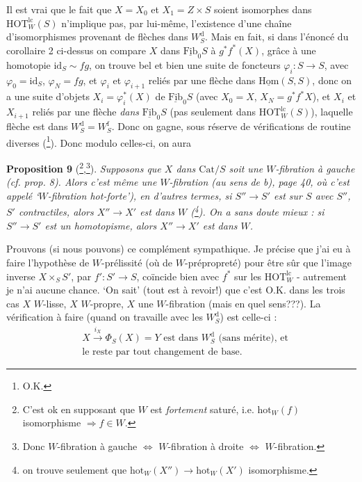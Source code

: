 \documentclass[11pt]{article}
\newcommand{\msp}[1]{\marginpar{\footnotesize [#1]}}
\newcommand{\hot}{\mathrm{hot}}
\newcommand{\id}{\mathrm{id}}
\newcommand{\HOTlc}{\mathrm{HOT}^{\mathrm{lc}}_W}
\newcommand{\Wd}{W^{\mathrm{d}}_S}
\newcommand{\Wf}{W^{\mathrm{f}}_S}
\begin{document}
Il est vrai que le fait que $X = X_0$ et $X_1 = Z \times S$ soient isomorphes dans $\HOTlc(S)$ n'implique pas, par lui-même, l'existence d'une \msp{page 48} chaîne d'isomorphismes provenant de flèches dans $\Wd$. Mais en fait, si dans l'énoncé du corollaire 2 ci-dessus on compare $X$ dans $\underline{\mathrm{Fib}}_0S$ à $g^*f^*(X)$, grâce à une homotopie $\id_S \sim fg$, on trouve bel et bien une suite de foncteurs $\varphi_i : S \longrightarrow S$, avec $\varphi_0 = \id_S$, $\varphi_N = fg$, et $\varphi_i$ et $\varphi_{i+1}$ reliés par une flèche dans $\underline{\mathrm{Hom}}(S,S)$, donc on a une suite d'objets $X_i = \varphi_i^*(X)$ de $\underline{\mathrm{Fib}}_0S$ (avec $X_0 = X$, $X_N = g^*f^*X$), et $X_i$ et $X_{i+1}$ reliés par une flèche \textit{dans} $\underline{\mathrm{Fib}}_0S$ (pas seulement dans $\HOTlc(S)$), laquelle flèche est dans $\Wd = \Wf$. Donc on gagne, sous réserve de vérifications de routine diverses (\footnote[55]{O.K.}). Donc modulo celles-ci, on aura

\textbf{Proposition 9} (\footnote[56]{C'est ok en supposant que $W$ est \textit{fortement} saturé, i.e. $\hot_W(f)$ isomorphisme $\Longrightarrow f \in W$.},\footnote[57]{Donc $W$-fibration à gauche $\Longleftrightarrow$ $W$-fibration à droite $\Longleftrightarrow$ $W$-fibration.}). \textit{Supposons que $X$ dans $\mathrm{Cat}/S$ soit une $W$-fibration à gauche (cf. prop. 8). Alors c'est même une $W$-fibration (au sens de b), page 40, où c'est appelé `$W$-fibration \textup{hot}-forte'), en d'autres termes, si $S'' \longrightarrow S'$ est sur $S$ avec $S''$, $S'$ contractiles, alors $X'' \longrightarrow X'$ est dans $W$ (\footnote[58]{on trouve seulement que $\hot_W(X'') \longrightarrow \hot_W(X')$ isomorphisme.}). On a sans doute mieux : si $S'' \longrightarrow S'$ est un homotopisme, alors $X'' \longrightarrow X'$ est dans $W$.}

\msp{page 49}
Prouvons (si nous pouvons) ce complément sympathique. Je précise que j'ai eu à faire l'hypothèse de $W$-prélissité (où de $W$-prépropreté) pour être sûr que l'image inverse $X \times_S S'$, par $f' : S' \longrightarrow S$, coïncide bien avec $f^*$ sur les $\HOTlc$ - autrement je n'ai aucune chance. %
`On sait' (tout est à revoir!) que c'est O.K. dans les trois cas $X$ $W$-lisse, $X$ $W$-propre, $X$ une $W$-fibration (mais en quel sens???). La vérification à faire (quand on travaille avec les $\Wd$) est celle-ci :
\[ \begin{aligned}
&X \xrightarrow{i_X} \Phi_S(X) = Y \text{ est dans } \Wd \text{ (sans mérite), et} \\
&\text{le reste par tout changement de base.}
\end{aligned} \tag*{$(*)$} \]
\end{document}
